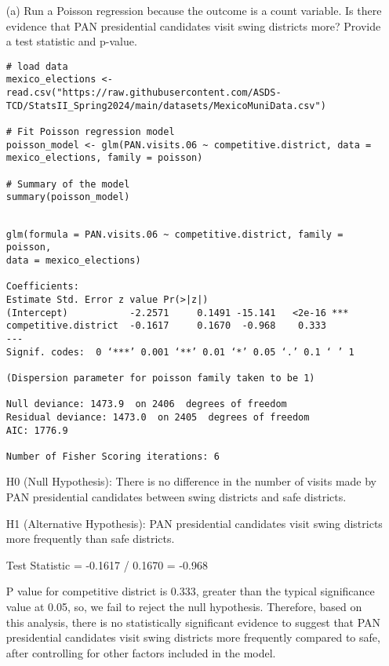 \documentclass[12pt,letterpaper]{article}
\begin{document}
\begin{enumerate}
	\item [(a)]
	Run a Poisson regression because the outcome is a count variable. Is there evidence that PAN presidential candidates visit swing districts more? Provide a test statistic and p-value.

\begin{lstlisting}	
# load data
mexico_elections <- read.csv("https://raw.githubusercontent.com/ASDS-TCD/StatsII_Spring2024/main/datasets/MexicoMuniData.csv")

# Fit Poisson regression model
poisson_model <- glm(PAN.visits.06 ~ competitive.district, data = mexico_elections, family = poisson)

# Summary of the model
summary(poisson_model)

\end{lstlisting}

\begin{verbatim}

glm(formula = PAN.visits.06 ~ competitive.district, family = poisson, 
data = mexico_elections)

Coefficients:
Estimate Std. Error z value Pr(>|z|)    
(Intercept)           -2.2571     0.1491 -15.141   <2e-16 ***
competitive.district  -0.1617     0.1670  -0.968    0.333    
---
Signif. codes:  0 ‘***’ 0.001 ‘**’ 0.01 ‘*’ 0.05 ‘.’ 0.1 ‘ ’ 1

(Dispersion parameter for poisson family taken to be 1)

Null deviance: 1473.9  on 2406  degrees of freedom
Residual deviance: 1473.0  on 2405  degrees of freedom
AIC: 1776.9

Number of Fisher Scoring iterations: 6

\end{verbatim}


H0 (Null Hypothesis): There is no difference in the number of visits made by PAN presidential candidates between swing districts and safe districts.

H1 (Alternative Hypothesis): PAN presidential candidates visit swing districts more frequently than safe districts.

Test Statistic = -0.1617 / 0.1670 = -0.968

P value for competitive district is 0.333, greater than the typical significance value at 0.05, so, we fail to reject the null hypothesis. Therefore, based on this analysis, there is no statistically significant evidence to suggest that PAN presidential candidates visit swing districts more frequently compared to safe, after controlling for other factors included in the model.


\end{enumerate}
\end{document}
